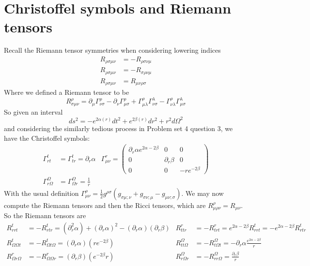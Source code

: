 \documentclass{article}
\begin{document}
	\section{Christoffel symbols and Riemann tensors}
	Recall the Riemann tensor symmetries when considering lowering indices
	\begin{align*}
		R_{\rho \sigma\mu \nu} &= - R_{\rho\sigma\nu\mu} \\
		R_{\rho \sigma\mu \nu} &= - R_{\sigma\rho\nu\mu} \\
		R_{\rho \sigma\mu \nu} &=  R_{\mu\nu\rho\sigma}
	\end{align*}
	Where we defined a Riemann tensor to be
	$$ R_{\sigma\mu\nu}^\rho = \partial_\mu \Gamma_{\nu\sigma}^\rho - \partial_\nu \Gamma_{\mu\sigma}^\rho + \Gamma_{\mu\lambda}^\rho \Gamma_{\nu\sigma}^\lambda - \Gamma_{\nu\lambda}^\rho \Gamma_{\mu\sigma}^\lambda$$
	So given an interval $$ ds^2 = -e^{2\alpha (r)} dt^2 + e^{2\beta(r)} dr^2 + r^2 d\Omega^2 $$ and considering the similarly tedious process in Problem set 4 question 3, we have the Christoffel symbols:
	\begin{align*}
		\Gamma_{rt}^t &= \Gamma_{tr}^t = \partial_r \alpha & \Gamma_{\mu\nu}^r = \begin{pmatrix}
			\partial_r \alpha e^{2\alpha - 2\beta} & 0 & 0 \\
			0 & \partial_r \beta & 0 \\
			0 & 0 & -re^{-2\beta} 
		\end{pmatrix} \\
		\Gamma_{r\Omega}^\Omega &= \Gamma_{\Omega r}^\Omega = \frac1r
	\end{align*}
	With the usual definition $\Gamma_{\mu\nu}^\rho = \frac12 g^{\rho\sigma} \left( g_{\sigma\mu;\nu} + g_{\sigma\nu;\mu} - g_{\mu\nu;\sigma} \right)$. We may now compute the Riemann tensors and then the Ricci tensors, which are $R^\rho_{\mu\rho\nu} = R_{\mu\nu}$. So the Riemann tensors are
	\begin{align*}
		R^{t}_{rrt} &= -R^t_{rtr} = \left(\partial_r^2 \alpha\right) + \left(\partial_r \alpha\right)^2 - \left(\partial_r \alpha\right)\left(\partial_r \beta\right) & R_{ttr}^r &= -R_{trt}^r = e^{2\alpha-2\beta}R^t_{rrt} = -e^{2\alpha - 2\beta} R^t_{rtr} \\
		R^{t}_{\Omega\Omega t} &= - R_{\Omega t \Omega}^t = \left( \partial_r \alpha \right)\left( r e^{-2\beta} \right) & R_{tt\Omega}^\Omega &= -R_{t\Omega t}^\Omega = -\partial_r \alpha \frac{e^{2\alpha - 2 \beta}}{r} \\
		R^{r}_{\Omega r \Omega} &= - R_{\Omega \Omega r}^r = \left(\partial_r \beta \right) \left( e^{-2\beta}r \right) & R_{r\Omega r}^\Omega &= - R^\Omega_{rr\Omega} = \frac{\partial_r \beta}{r}
	\end{align*}
\end{document}
